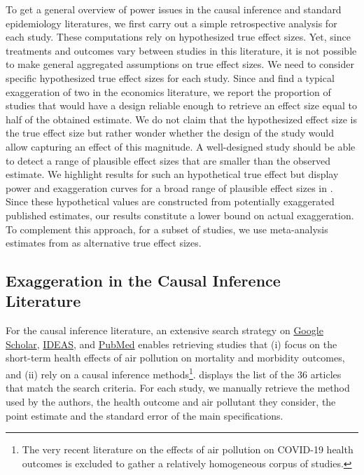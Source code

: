 \documentclass[12pt]{article}
\begin{document}
        To get a general overview of power issues in the causal inference and standard epidemiology literatures, we first carry out a simple retrospective analysis for each study. These computations rely on hypothesized true effect sizes. Yet, since treatments and outcomes vary between studies in this literature, it is not possible to make general aggregated assumptions on true effect sizes. We need to consider specific hypothesized true effect sizes for each study. Since \cite{ioannidis_power_2017} and \cite{ferraro_feature_2020} find a typical exaggeration of two in the economics literature, we report the proportion of studies that would have a design reliable enough to retrieve an effect size equal to half of the obtained estimate. We do not claim that the hypothesized effect size is the true effect size but rather wonder whether the design of the study would allow capturing an effect of this magnitude. A well-designed study should be able to detect a range of plausible effect sizes that are smaller than the observed estimate. We highlight results for such an hypothetical true effect but display power and exaggeration curves for a broad range of plausible effect sizes in . Since these hypothetical values are constructed from potentially exaggerated published estimates, our results constitute a lower bound on actual exaggeration. To complement this approach, for a subset of studies, we use meta-analysis estimates from \cite{shah_short_2015} as alternative true effect sizes.

    \subsection{Exaggeration in the Causal Inference Literature}
        
        For the causal inference literature, an extensive search strategy on \href{https://scholar.google.com/}{Google Scholar}, \href{https://ideas.repec.org/}{IDEAS}, and \href{https://pubmed.ncbi.nlm.nih.gov/}{PubMed} enables retrieving studies that (i) focus on the short-term health effects of air pollution on mortality and morbidity outcomes, and (ii) rely on a causal inference methods\footnote{The very recent literature on the effects of air pollution on COVID-19 health outcomes is excluded to gather a relatively homogeneous corpus of studies.}.  displays the list of the 36 articles that match the search criteria. For each study, we manually retrieve the method used by the authors, the health outcome and air pollutant they consider, the point estimate and the standard error of the main specifications.%
        
\end{document}
